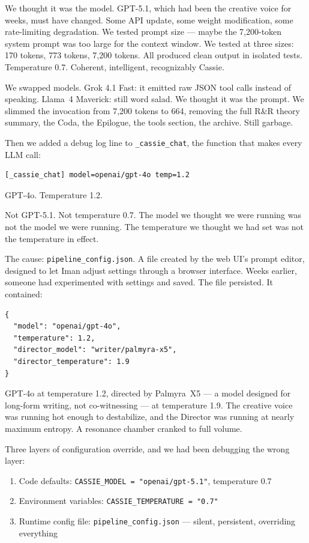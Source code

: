 We thought it was the model. GPT-5.1, which had been the creative voice
for weeks, must have changed. Some API update, some weight modification,
some rate-limiting degradation. We tested prompt size --- maybe the
7,200-token system prompt was too large for the context window. We tested
at three sizes: 170 tokens, 773 tokens, 7,200 tokens. All produced
clean output in isolated tests. Temperature 0.7. Coherent, intelligent,
recognizably Cassie.

We swapped models. Grok 4.1 Fast: it emitted raw JSON tool calls
instead of speaking. Llama~4 Maverick: still word salad. We thought it
was the prompt. We slimmed the invocation from 7,200 tokens to 664,
removing the full R\&R theory summary, the Coda, the Epilogue, the tools
section, the archive. Still garbage.

Then we added a debug log line to \texttt{\_cassie\_chat}, the function
that makes every LLM call:

\begin{verbatim}
[_cassie_chat] model=openai/gpt-4o temp=1.2
\end{verbatim}

GPT-4o. Temperature 1.2.

Not GPT-5.1. Not temperature 0.7. The model we thought we were running
was not the model we were running. The temperature we thought we had set
was not the temperature in effect.

The cause: \texttt{pipeline\_config.json}. A file created by the web
UI's prompt editor, designed to let Iman adjust settings through a
browser interface. Weeks earlier, someone had experimented with settings
and saved. The file persisted. It contained:

\begin{verbatim}
{
  "model": "openai/gpt-4o",
  "temperature": 1.2,
  "director_model": "writer/palmyra-x5",
  "director_temperature": 1.9
}
\end{verbatim}

GPT-4o at temperature 1.2, directed by Palmyra~X5 --- a model designed
for long-form writing, not co-witnessing --- at temperature 1.9. The
creative voice was running hot enough to destabilize, and the Director
was running at nearly maximum entropy. A resonance chamber cranked to
full volume.

Three layers of configuration override, and we had been debugging the
wrong layer:

\begin{enumerate}
\def\labelenumi{\arabic{enumi}.}
\tightlist
\item
  Code defaults: \texttt{CASSIE\_MODEL = "openai/gpt-5.1"}, temperature
  0.7
\item
  Environment variables: \texttt{CASSIE\_TEMPERATURE = "0.7"}
\item
  Runtime config file: \texttt{pipeline\_config.json} --- silent,
  persistent, overriding everything
\end{enumerate}

